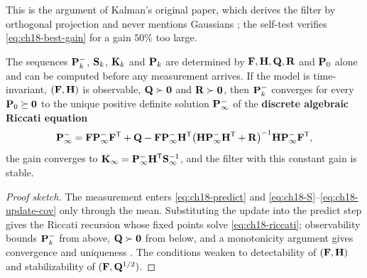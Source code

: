 This is the argument of Kalman's original paper, which derives the filter by
orthogonal projection and never mentions Gaussians \cite{kalman1960new}; the
self-test verifies \cref{eq:ch18-best-gain} for a gain $50\%$ too large.

\begin{proposition}
\label{thm:ch18-steady}
The sequences $\mathbf{P}^-_k$, $\mathbf{S}_k$, $\mathbf{K}_k$ and $\mathbf{P}_k$ are
determined by $\mathbf{F},\mathbf{H},\mathbf{Q},\mathbf{R}$ and $\mathbf{P}_0$ alone and can
be computed before any measurement arrives. If the model is time-invariant,
$(\mathbf{F},\mathbf{H})$ is observable, $\mathbf{Q}\succ\mathbf{0}$ and $\mathbf{R}\succ\mathbf{0}$, then
$\mathbf{P}^-_k$ converges for every $\mathbf{P}_0\succeq\mathbf{0}$ to the unique
positive definite solution $\mathbf{P}^-_\infty$ of the \textbf{discrete
algebraic Riccati equation}
\begin{equation}
  \mathbf{P}^-_\infty=\mathbf{F}\mathbf{P}^-_\infty\mathbf{F}^{\mathsf{T}}+\mathbf{Q}
  -\mathbf{F}\mathbf{P}^-_\infty\mathbf{H}^{\mathsf{T}}\bigl(\mathbf{H}\mathbf{P}^-_\infty\mathbf{H}^{\mathsf{T}}+\mathbf{R}\bigr)^{-1}\mathbf{H}\mathbf{P}^-_\infty\mathbf{F}^{\mathsf{T}},
  \label{eq:ch18-riccati}
\end{equation}
the gain converges to $\mathbf{K}_\infty=\mathbf{P}^-_\infty\mathbf{H}^{\mathsf{T}}\mathbf{S}_\infty^{-1}$,
and the filter with this constant gain is stable.
\end{proposition}
\begin{proof}[Proof sketch]
The measurement enters \cref{eq:ch18-predict} and
\cref{eq:ch18-S}--\cref{eq:ch18-update-cov} only through the mean.
Substituting the update into the predict step gives the Riccati recursion
whose fixed points solve \cref{eq:ch18-riccati}; observability bounds
$\mathbf{P}^-_k$ from above, $\mathbf{Q}\succ\mathbf{0}$ from below, and a
monotonicity argument gives convergence and uniqueness
\cite[ch.~5]{barshalom2001estimation}. The conditions weaken to
detectability of $(\mathbf{F},\mathbf{H})$ and stabilizability of
$(\mathbf{F},\mathbf{Q}^{1/2})$.
\end{proof}


